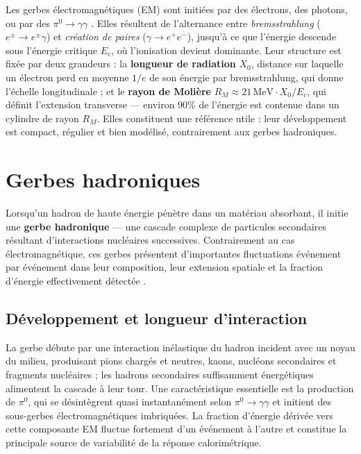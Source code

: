 Les gerbes électromagnétiques (EM) sont initiées par des électrons, des photons, ou par des
$\pi^0 \to \gamma\gamma$ \cite{heitler1954, rossi1952}. Elles résultent de l'alternance entre
\textit{bremsstrahlung} ($e^\pm \to e^\pm\gamma$) et \textit{création de paires}
($\gamma \to e^+e^-$), jusqu'à ce que l'énergie descende sous l'énergie critique $E_c$, où
l'ionisation devient dominante. Leur structure est fixée par deux grandeurs \cite{pdg2024} : la
\textbf{longueur de radiation} $X_0$, distance sur laquelle un électron perd en moyenne $1/e$ de son
énergie par bremsstrahlung, qui donne l'échelle longitudinale ; et le \textbf{rayon de Molière}
$R_M \approx 21\,\mathrm{MeV}\cdot X_0 / E_c$, qui définit l'extension transverse — environ 90\% de
l'énergie est contenue dans un cylindre de rayon $R_M$. Elles constituent une référence utile : leur
développement est compact, régulier et bien modélisé, contrairement aux gerbes hadroniques.

\section{Gerbes hadroniques}
\label{sec:gerbes-had}

Lorsqu'un hadron de haute énergie pénètre dans un matériau absorbant, il initie une
\textbf{gerbe hadronique} — une cascade complexe de particules secondaires résultant d'interactions
nucléaires successives. Contrairement au cas électromagnétique, ces gerbes présentent d'importantes
fluctuations événement par événement dans leur composition, leur extension spatiale et la fraction
d'énergie effectivement détectée \cite{wigmans2000, fabjan2003}.

\subsection{Développement et longueur d'interaction}

La gerbe débute par une interaction inélastique du hadron incident avec un noyau du milieu,
produisant pions chargés et neutres, kaons, nucléons secondaires et fragments nucléaires ; les
hadrons secondaires suffisamment énergétiques alimentent la cascade à leur tour. Une caractéristique
essentielle est la production de $\pi^0$, qui se désintègrent quasi instantanément selon
$\pi^0 \rightarrow \gamma\gamma$ et initient des sous-gerbes électromagnétiques imbriquées. La
fraction d'énergie dérivée vers cette composante EM fluctue fortement d'un événement à l'autre et
constitue la principale source de variabilité de la réponse calorimétrique.

